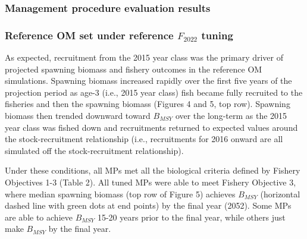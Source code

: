 \documentclass[11pt]{book}
\begin{document}
\hypertarget{management-procedure-evaluation-results}{%
\subsubsection{Management procedure evaluation results}\label{management-procedure-evaluation-results}}

\hypertarget{reference-om-set-under-reference-f_2022-tuning}{%
\subsubsection{\texorpdfstring{Reference OM set under reference \(F_{2022}\) tuning}{Reference OM set under reference F\_\{2022\} tuning}}\label{reference-om-set-under-reference-f_2022-tuning}}

As expected, recruitment from the 2015 year class was the primary driver of projected spawning biomass and fishery outcomes in the reference OM simulations. Spawning biomass increased rapidly over the first five years of the projection period as age-3 (i.e., 2015 year class) fish became fully recruited to the fisheries and then the spawning biomass (Figures 4 and 5, top row). Spawning biomass then trended downward toward \(B_{MSY}\) over the long-term as the 2015 year class was fished down and recruitments returned to expected values around the stock-recruitment relationship (i.e., recruitments for 2016 onward are all simulated off the stock-recruitment relationship).

Under these conditions, all MPs met all the biological criteria defined by Fishery Objectives 1-3 (Table 2). All tuned MPs were able to meet Fishery Objective 3, where median spawning biomass (top row of Figure 5) achieves \(B_{MSY}\) (horizontal dashed line with green dots at end points) by the final year (2052). Some MPs are able to achieve \(B_{MSY}\) 15-20 years prior to the final year, while others just make \(B_{MSY}\) by the final year.
\end{document}
